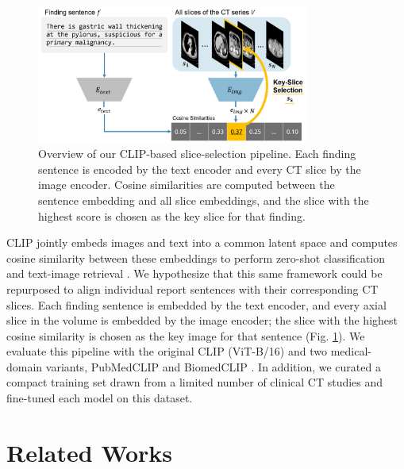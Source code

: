 \documentclass[bioengineering,article,submit,pdftex,moreauthors]{Definitions/mdpi}
\begin{document}
\begin{figure}[ht]
  \centering
  \includegraphics[width=0.8\textwidth]{./figures/figure1_9.png}
  \caption{
    Overview of our CLIP-based slice-selection pipeline. 
    Each finding sentence is encoded by the text encoder and every CT slice by the image encoder. 
    Cosine similarities are computed between the sentence embedding and all slice embeddings, and the slice with the highest score is chosen as the key slice for that finding. 
}
  \label{fig:clip_overview}
\end{figure}


CLIP jointly embeds images and text into a common latent space and computes cosine similarity between these embeddings to perform zero-shot classiﬁcation and text-image retrieval \cite{radford_learning_2021}. 
We hypothesize that this same framework could be repurposed to align individual report sentences with their corresponding CT slices. 
Each finding sentence is embedded by the text encoder, and every axial slice in the volume is embedded by the image encoder; the slice with the highest cosine similarity is chosen as the key image for that sentence (Fig. \ref{fig:clip_overview}). 
We evaluate this pipeline with the original CLIP (ViT-B/16) and two medical-domain variants, PubMedCLIP and BiomedCLIP \cite{radford_learning_2021,eslami_pubmedclip_2023,zhang_biomedclip_2025}. 
In addition, we curated a compact training set drawn from a limited number of clinical CT studies and fine-tuned each model on this dataset. 




\section{Related Works}
\end{document}
